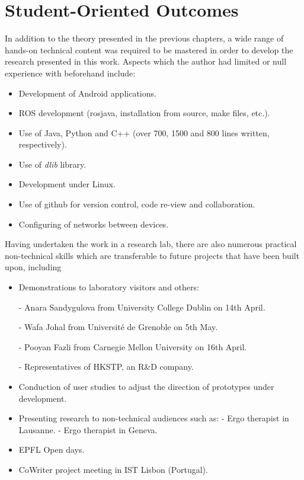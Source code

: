 \chapter{Student-Oriented Outcomes} \label{appendix2}

In addition to the theory presented in the previous chapters, a wide range of hands-on technical
content was required to be mastered in order to develop the research presented in this work.
Aspects which the author had limited or null experience with beforehand include:

\begin{itemize}
\item Development of Android applications.
\item ROS development (rosjava, installation from source, make files, etc.).
\item Use of Java, Python and C++ (over 700, 1500 and 800 lines written, respectively).
\item Use of \textit{dlib} library.
\item Development under Linux.
\item Use of github for version control, code re-view and collaboration.
\item Configuring of networks between devices.
\end{itemize}

Having undertaken the work in a research lab, there are also numerous practical non-technical skills which are transferable to future projects that have been built upon, including

\begin{itemize}
\item Demonstrations to laboratory visitors and others:

- Anara Sandygulova from University College Dublin on 14th April.

- Wafa Johal from Universit\'e de Grenoble on 5th May.

- Pooyan Fazli from Carnegie Mellon University on 16th April.

- Representatives of HKSTP, an R\&D company.

\item Conduction of user studies to adjust the direction of prototypes under development.
\item Presenting research to non-technical audiences such as:
		- Ergo therapist in Lausanne.
		- Ergo therapist in Geneva.
\item EPFL Open days.
\item CoWriter project meeting in IST Lisbon (Portugal).

\end{itemize}
